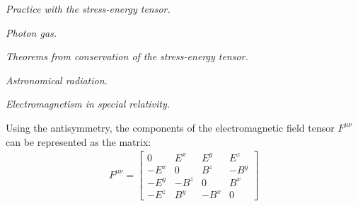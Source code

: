 \documentclass{report}
\begin{document}
\begin{subquests}
	\item \emph{Practice with the stress-energy tensor.}
	\begin{subquests}
		\item

		\item

		\item
	\end{subquests}

	\item \emph{Photon gas.}

	\item \emph{Theorems from conservation of the stress-energy tensor.}
	\begin{subquests}
		\item

		\item

		\item
	\end{subquests}
	
	\item \emph{Astronomical radiation.}
	\begin{subquests}
		\item

		\item

		\item
	\end{subquests}
	
	\item \emph{Electromagnetism in special relativity.}
	\begin{subquests}
		\item
		Using the antisymmetry, the components of the electromagnetic field tensor $F^{\mu\nu}$	can be represented as the matrix:
		\begin{gather*}
			F^{\mu\nu} =
			\begin{bmatrix}
				0 & E^x & E^y & E^z \\
				-E^x & 0 & B^z & -B^y \\
				-E^y & -B^z & 0 & B^x \\
				-E^z & B^y & -B^x & 0
			\end{bmatrix}
		\end{gather*}
		

\end{subquests}
\end{subquests}
\end{document}
